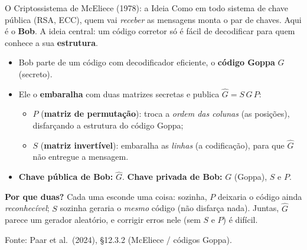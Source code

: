 \documentclass{beamer}
\begin{document}
\begin{frame}{O Criptossistema de McEliece (1978): a Ideia}
    \footnotesize
    Como em todo sistema de chave pública (RSA, ECC), quem vai \emph{receber} as mensagens monta o par de chaves. Aqui é o \textbf{Bob}. A ideia central: um código corretor só é fácil de decodificar para quem conhece a sua \textbf{estrutura}.
    \medskip
    \begin{itemize}
        \item Bob parte de um código com decodificador eficiente, o \textbf{código Goppa} $G$ (secreto).
        \item Ele o \textbf{embaralha} com duas matrizes secretas e publica $\hat{G} = S\,G\,P$:
        \begin{itemize}\scriptsize
            \item[--] $P$ (\textbf{matriz de permutação}): troca a \emph{ordem das colunas} (as posições), disfarçando a estrutura do código Goppa;
            \item[--] $S$ (\textbf{matriz invertível}): embaralha as \emph{linhas} (a codificação), para que $\hat{G}$ não entregue a mensagem.
        \end{itemize}
        \item \textbf{Chave pública de Bob:} $\hat{G}$. \quad \textbf{Chave privada de Bob:} $G$ (Goppa), $S$ e $P$.
    \end{itemize}
    \smallskip
    \begin{tcolorbox}[colback=blue!5,colframe=blue!50!black,boxrule=0.5pt]
        \footnotesize
        \textbf{Por que duas?} Cada uma esconde uma coisa: sozinha, $P$ deixaria o código ainda \emph{reconhecível}; $S$ sozinha geraria o \emph{mesmo} código (não disfarça nada). Juntas, $\hat{G}$ parece um gerador aleatório, e corrigir erros nele (sem $S$ e $P$) é difícil.
    \end{tcolorbox}
    \smallskip
    {\tiny Fonte: Paar et al.\ (2024), §12.3.2 (McEliece / códigos Goppa).}
\end{frame}
\end{document}
